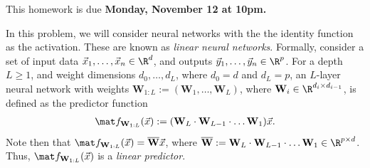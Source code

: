 \documentclass[11pt]{article}
\begin{document}
This homework is due \textbf{Monday, November 12 at 10pm.}




\newcommand{\weight}{\mathbf{W}}
\newcommand{\weightprod}{\overline{\mathbf{W}}}

In this problem, we will consider neural networks with the the identity function as the activation. These are known as \emph{linear neural networks}. Formally, consider a set of input data $\vec x_1,\dots,\vec x_n \in \R^d$, and outputs $\vec y_1,\dots,\vec y_n \in \R^p$. For a depth $L \ge 1$, and weight dimensions $d_0,\dots,d_L$, where $d_0 = d$ and $d_L = p$, an $L$-layer neural network with weights $\weight_{1:L} := (\weight_1,\dots,\weight_L)$, where $\weight_i \in \R^{d_{i} \times d_{i-1}}$, is defined as the predictor function
\begin{align*}
\mat f_{\weight_{1:L}}(\vec x) := (\weight_L \cdot \weight_{L-1} \cdot \dots \weight_{1})\vec x.
\end{align*}
Note then that $\mat f_{\weight_{1:L}}(\vec x) = \weightprod \vec x$, where $\weightprod := \weight_L \cdot \weight_{L-1} \cdot \dots \weight_{1} \in \R^{p\times d}$. Thus, $\mat f_{\weight_{1:L}}(\vec x)$ is a \emph{linear predictor}.
\end{document}
